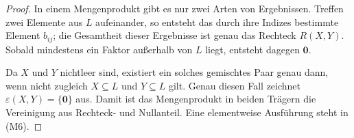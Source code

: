 \documentclass[main.tex]{subfiles}
\begin{document}
\begin{tabproofwide}
\end{tabproofwide}


\begin{proof}
In einem Mengenprodukt gibt es nur zwei Arten von Ergebnissen. Treffen zwei
Elemente aus \(L\) aufeinander, so entsteht das durch ihre Indizes bestimmte
Element \(b_{ij}\); die Gesamtheit dieser Ergebnisse ist genau das Rechteck
\(R(X,Y)\). Sobald mindestens ein Faktor außerhalb von \(L\) liegt, entsteht
dagegen \(\mathbf0\).

Da \(X\) und \(Y\) nichtleer sind, existiert ein solches gemischtes Paar
genau dann, wenn nicht zugleich \(X\subseteq L\) und \(Y\subseteq L\) gilt.
Genau diesen Fall zeichnet \(\varepsilon(X,Y)=\{\mathbf0\}\) aus. Damit ist
das Mengenprodukt in beiden Trägern die Vereinigung aus Rechteck- und
Nullanteil. Eine elementweise Ausführung steht in \textup{(M6)}.
\end{proof}
\end{document}
